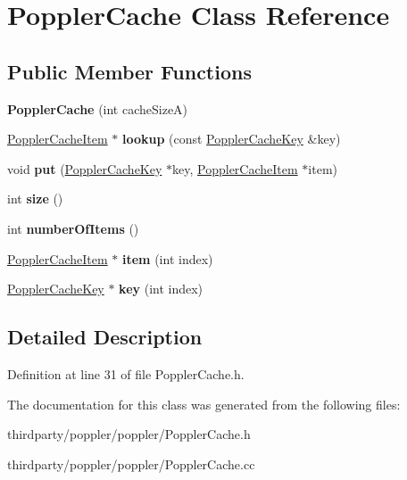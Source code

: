 \hypertarget{class_poppler_cache}{}\section{Poppler\+Cache Class Reference}
\label{class_poppler_cache}
\subsection*{Public Member Functions}
\begin{DoxyCompactItemize}
\item 
\mbox{\label{class_poppler_cache_aacc4857f9d6682d3ccfc340b8cfcf78d}} 
{\bfseries Poppler\+Cache} (int cache\+SizeA)
\item 
\mbox{\label{class_poppler_cache_a41d1b6a2e2427e31194b1d784a2efa6b}} 
\hyperlink{class_poppler_cache_item}{Poppler\+Cache\+Item} $\ast$ {\bfseries lookup} (const \hyperlink{class_poppler_cache_key}{Poppler\+Cache\+Key} \&key)
\item 
\mbox{\label{class_poppler_cache_ae4de8fad08ca36114f90541ad9763045}} 
void {\bfseries put} (\hyperlink{class_poppler_cache_key}{Poppler\+Cache\+Key} $\ast$key, \hyperlink{class_poppler_cache_item}{Poppler\+Cache\+Item} $\ast$item)
\item 
\mbox{\label{class_poppler_cache_aff621681ada44409d73c9c819eb4ea34}} 
int {\bfseries size} ()
\item 
\mbox{\label{class_poppler_cache_acd3aaf01d137fe47082eac09537c92c6}} 
int {\bfseries number\+Of\+Items} ()
\item 
\mbox{\label{class_poppler_cache_a811db0005b562034086b6e6c2b8d8a1a}} 
\hyperlink{class_poppler_cache_item}{Poppler\+Cache\+Item} $\ast$ {\bfseries item} (int index)
\item 
\mbox{\label{class_poppler_cache_ac57431e6bad466b50f429014d016d632}} 
\hyperlink{class_poppler_cache_key}{Poppler\+Cache\+Key} $\ast$ {\bfseries key} (int index)
\end{DoxyCompactItemize}


\subsection{Detailed Description}


Definition at line 31 of file Poppler\+Cache.\+h.



The documentation for this class was generated from the following files\+:\begin{DoxyCompactItemize}
\item 
thirdparty/poppler/poppler/Poppler\+Cache.\+h\item 
thirdparty/poppler/poppler/Poppler\+Cache.\+cc\end{DoxyCompactItemize}
